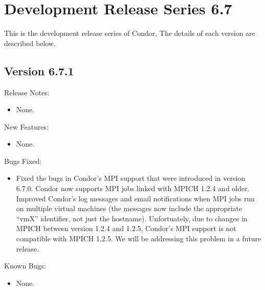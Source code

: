 \section{\label{sec:History-6-7}Development Release Series 6.7}

This is the development release series of Condor,
The details of each version are described below.

\subsection{\label{sec:New-6-7-1}Version 6.7.1}

\noindent Release Notes:

\begin{itemize}

\item None.

\end{itemize}


\noindent New Features:

\begin{itemize}

\item None.

\end{itemize}

\noindent Bugs Fixed:

\begin{itemize}

\item Fixed the bugs in Condor's MPI support that were introduced in
  version 6.7.0.
  Condor now supports MPI jobs linked with MPICH 1.2.4 and older.
  Improved Condor's log messages and email notifications when MPI jobs
  run on multiple virtual machines (the messages now include the
  appropriate ``vmX'' identifier, not just the hostname).
  Unfortuately, due to changes in MPICH between version 1.2.4 and
  1.2.5, Condor's MPI support is not compatible with MPICH 1.2.5.
  We will be addressing this problem in a future release.

\end{itemize}

\noindent Known Bugs:

\begin{itemize}

\item None.

\end{itemize}




